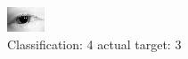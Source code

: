 \begin{figure}[h!]
\begin{center}
\includegraphics[width=0.60\columnwidth]{figures/ID23_class_4_target_3.png}
\end{center}
\caption{ Classification: 4 actual target: 3}
\label{fig:ID23_class_4_target_3}
\end{figure}
